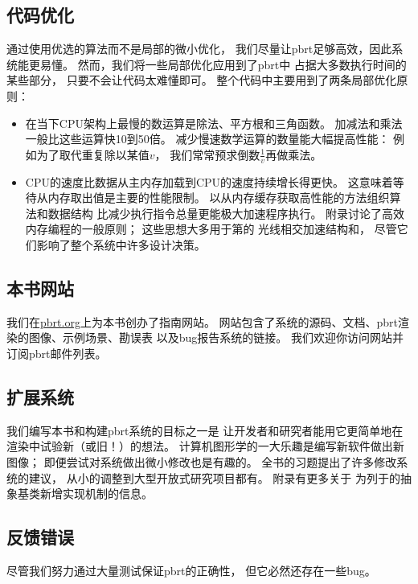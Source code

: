 \subsection{代码优化}\label{sub:代码优化}
通过使用优选的算法而不是局部的微小优化，
我们尽量让pbrt足够高效，因此系统能更易懂。
然而，我们将一些局部优化应用到了pbrt中
占据大多数执行时间的某些部分，
只要不会让代码太难懂即可。
整个代码中主要用到了两条局部优化原则：
\begin{itemize}
    \item 在当下CPU架构上最慢的数运算是除法、平方根和三角函数。
          加减法和乘法一般比这些运算快10到50倍。
          减少慢速数学运算的数量能大幅提高性能：
          例如为了取代重复除以某值$v$，
          我们常常预求倒数$\displaystyle\frac{1}{v}$再做乘法。
    \item CPU的速度比数据从主内存加载到CPU的速度持续增长得更快。
          这意味着等待从内存取出值是主要的性能限制。
          以从内存缓存获取高性能的方法组织算法和数据结构
          比减少执行指令总量更能极大加速程序执行。
          附录讨论了高效内存编程的一般原则；
          这些思想大多用于第的
          光线相交加速结构和，
          尽管它们影响了整个系统中许多设计决策。
\end{itemize}

\subsection{本书网站}\label{sub:本书网站}
我们在\href{https://pbrt.org/}{\ttfamily pbrt.org}上为本书创办了指南网站。
网站包含了系统的源码、文档、pbrt渲染的图像、示例场景、勘误表
以及bug报告系统的链接。
我们欢迎你访问网站并订阅pbrt邮件列表。

\subsection{扩展系统}\label{sub:扩展系统}
我们编写本书和构建pbrt系统的目标之一是
让开发者和研究者能用它更简单地在渲染中试验新（或旧！）的想法。
计算机图形学的一大乐趣是编写新软件做出新图像；
即便尝试对系统做出微小修改也是有趣的。
全书的习题提出了许多修改系统的建议，
从小的调整到大型开放式研究项目都有。
附录有更多关于
为列于的抽象基类新增实现机制的信息。

\subsection{反馈错误}\label{sub:反馈错误}
尽管我们努力通过大量测试保证pbrt的正确性，
但它必然还存在一些bug。

